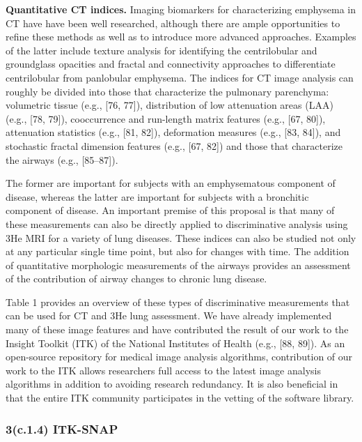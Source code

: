 \documentclass[11pt,]{article}
\begin{document}
\textbf{Quantitative CT indices.} Imaging biomarkers for characterizing
emphysema in CT have have been well researched, although there are ample
opportunities to refine these methods as well as to introduce more
advanced approaches. Examples of the latter include texture analysis for
identifying the centrilobular and groundglass opacities and fractal and
connectivity approaches to differentiate centrilobular from panlobular
emphysema. The indices for CT image analysis can roughly be divided into
those that characterize the pulmonary parenchyma: volumetric tissue
(e.g., {[}76, 77{]}), distribution of low attenuation areas (LAA) (e.g.,
{[}78, 79{]}), cooccurrence and run-length matrix features (e.g., {[}67,
80{]}), attenuation statistics (e.g., {[}81, 82{]}), deformation
measures (e.g., {[}83, 84{]}), and stochastic fractal dimension features
(e.g., {[}67, 82{]}) and those that characterize the airways (e.g.,
{[}85--87{]}).

The former are important for subjects with an emphysematous component of
disease, whereas the latter are important for subjects with a bronchitic
component of disease. An important premise of this proposal is that many
of these measurements can also be directly applied to discriminative
analysis using 3He MRI for a variety of lung diseases. These indices can
also be studied not only at any particular single time point, but also
for changes with time. The addition of quantitative morphologic
measurements of the airways provides an assessment of the contribution
of airway changes to chronic lung disease.



Table 1 provides an overview of these types of discriminative
measurements that can be used for CT and 3He lung assessment. We have
already implemented many of these image features and have contributed
the result of our work to the Insight Toolkit (ITK) of the National
Institutes of Health (e.g., {[}88, 89{]}). As an open-source repository
for medical image analysis algorithms, contribution of our work to the
ITK allows researchers full access to the latest image analysis
algorithms in addition to avoiding research redundancy. It is also
beneficial in that the entire ITK community participates in the vetting
of the software library.

\subsubsection{3(c.1.4) ITK-SNAP}\label{c.1.4-itk-snap}
\end{document}
